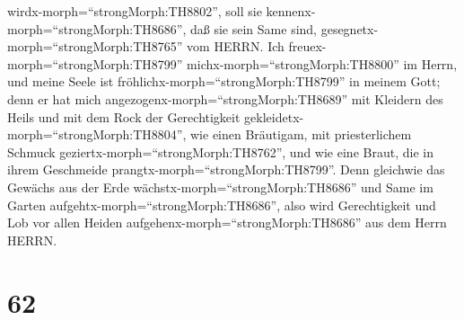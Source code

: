 wirdx-morph=``strongMorph:TH8802'', soll sie
kennenx-morph=``strongMorph:TH8686'', daß sie sein Same sind,
gesegnetx-morph=``strongMorph:TH8765'' vom HERRN.  Ich
freuex-morph=``strongMorph:TH8799'' michx-morph=``strongMorph:TH8800''
im Herrn, und meine Seele ist fröhlichx-morph=``strongMorph:TH8799'' in
meinem Gott; denn er hat mich angezogenx-morph=``strongMorph:TH8689''
mit Kleidern des Heils und mit dem Rock der Gerechtigkeit
gekleidetx-morph=``strongMorph:TH8804'', wie einen Bräutigam, mit
priesterlichem Schmuck geziertx-morph=``strongMorph:TH8762'', und wie
eine Braut, die in ihrem Geschmeide
prangtx-morph=``strongMorph:TH8799''.  Denn gleichwie das
Gewächs aus der Erde wächstx-morph=``strongMorph:TH8686'' und Same im
Garten aufgehtx-morph=``strongMorph:TH8686'', also wird Gerechtigkeit
und Lob vor allen Heiden aufgehenx-morph=``strongMorph:TH8686'' aus dem
Herrn HERRN.

\hypertarget{section-61}{%
\section{62}\label{section-61}}

